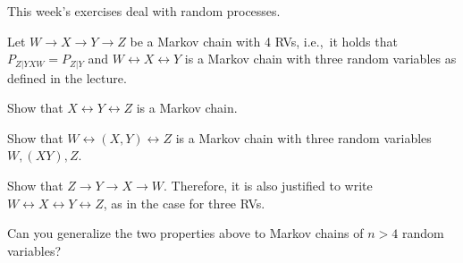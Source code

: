 \documentclass[a4paper,10pt,landscape,twocolumn]{scrartcl}
\begin{document}
\practiceproblems

{\sffamily\noindent
This week's exercises deal with random processes. \practiceinstructions
}

\begin{exercise}
Let $W \rightarrow X \rightarrow Y \rightarrow Z$ be a Markov chain with 4 RVs, i.e.,\ it holds that $P_{Z|YXW} = P_{Z|Y}$ and $W \leftrightarrow X \leftrightarrow Y$ is a Markov chain with three random variables as defined in the lecture.
\begin{subex}
	Show that $X \leftrightarrow Y \leftrightarrow Z$ is a Markov chain.
\end{subex}
\begin{subex}
Show that $W \leftrightarrow (X,Y) \leftrightarrow Z$ is a Markov chain with three random variables $W, (XY), Z$.
\end{subex}
\begin{subex}
Show that $Z \rightarrow Y \rightarrow X \rightarrow W$. Therefore, it is also justified to write $W \leftrightarrow X \leftrightarrow Y \leftrightarrow Z$, as in the case for three RVs.
\end{subex}
\begin{subex**}
Can you generalize the two properties above to Markov chains of $n>4$ random variables?
\end{subex**}
\end{exercise}




\end{document}

